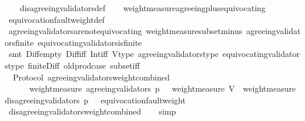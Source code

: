 \begin{isabellebody}
%
\isadelimproof
\ \ %
\endisadelimproof
%
\isatagproof
{}\isamarkupfalse%
\ disagreeing{\isacharunderscore}validators{\isacharunderscore}def\isanewline
\ \ \isamarkupfalse%
\ weight{\isacharunderscore}measure{\isacharunderscore}agreeing{\isacharunderscore}plus{\isacharunderscore}equivocating\isanewline
\ \ \isamarkupfalse%
\ equivocation{\isacharunderscore}fault{\isacharunderscore}weight{\isacharunderscore}def\isanewline
\ \ \isamarkupfalse%
\ agreeing{\isacharunderscore}validators{\isacharunderscore}are{\isacharunderscore}not{\isacharunderscore}equivocating\ weight{\isacharunderscore}measure{\isacharunderscore}subset{\isacharunderscore}minus\ agreeing{\isacharunderscore}validators{\isacharunderscore}finite\ equivocating{\isacharunderscore}validators{\isacharunderscore}is{\isacharunderscore}finite\isanewline
\ \ \isamarkupfalse%
\ {\isacharparenleft}smt\ Diff{\isacharunderscore}empty\ Diff{\isacharunderscore}iff\ Int{\isacharunderscore}iff\ V{\isacharunderscore}type\ agreeing{\isacharunderscore}validators{\isacharunderscore}type\ equivocating{\isacharunderscore}validators{\isacharunderscore}type\ finite{\isacharunderscore}Diff\ old{\isachardot}prod{\isachardot}case\ subset{\isacharunderscore}iff{\isacharparenright}%
\endisatagproof
{\isafoldproof}%
%
\isadelimproof
\isanewline
%
\endisadelimproof
\isanewline
{}\isamarkupfalse%
\ {\isacharparenleft}\ Protocol{\isacharparenright}\ agreeing{\isacharunderscore}validators{\isacharunderscore}weight{\isacharunderscore}combined\ {\isacharcolon}\isanewline
\ \ {\isachardoublequoteopen}{\isasymforall}\ {\isasymsigma}\ {\isasymin}\ {\isasymSigma}{\isachardot}\ weight{\isacharunderscore}measure\ {\isacharparenleft}agreeing{\isacharunderscore}validators\ {\isacharparenleft}p{\isacharcomma}\ {\isasymsigma}{\isacharparenright}{\isacharparenright}\ {\isacharequal}\ weight{\isacharunderscore}measure\ V\ {\isacharminus}\ weight{\isacharunderscore}measure\ {\isacharparenleft}disagreeing{\isacharunderscore}validators\ {\isacharparenleft}p{\isacharcomma}\ {\isasymsigma}{\isacharparenright}{\isacharparenright}\ {\isacharminus}\ equivocation{\isacharunderscore}fault{\isacharunderscore}weight\ {\isasymsigma}{\isachardoublequoteclose}\isanewline
%
\isadelimproof
\ \ %
\endisadelimproof
%
\isatagproof
{}\isamarkupfalse%
\ disagreeing{\isacharunderscore}validators{\isacharunderscore}weight{\isacharunderscore}combined\isanewline
\ \ \isamarkupfalse%
\ simp%
\endisatagproof
{\isafoldproof}%

\end{isabellebody}
